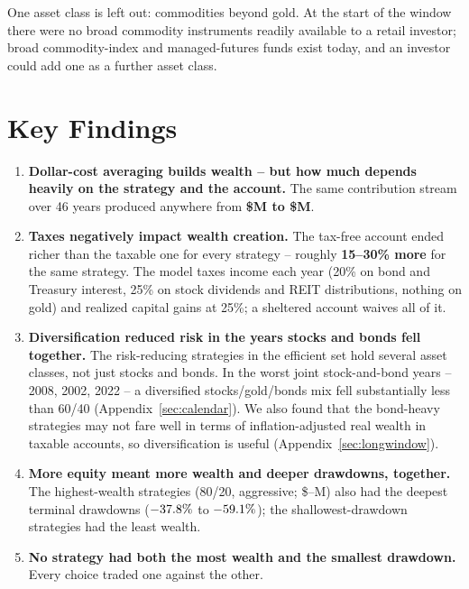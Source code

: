 \documentclass[11pt]{article}
\begin{document}
One asset class is left out: commodities beyond gold. At the start of the window there were no broad
commodity instruments readily available to a retail investor; broad commodity-index and
managed-futures funds exist today, and an investor could add one as a further asset class.

\section{Key Findings}\label{sec:keyfindings}

\begin{enumerate}

\item \textbf{Dollar-cost averaging builds wealth -- but how much depends heavily on the strategy and
the account.} The same contribution stream over 46 years produced anywhere from \textbf{\$\WealthRangeLo M to \$\WealthRangeHi M}.

\item \textbf{Taxes negatively impact wealth creation.} The tax-free account ended richer than the
taxable one for every strategy -- roughly \textbf{15--30\% more} for the same strategy. The model taxes
income each year (20\% on bond and Treasury interest, 25\% on stock dividends and REIT distributions,
nothing on gold) and realized capital gains at 25\%; a sheltered account waives all of it.

\item \textbf{Diversification reduced risk in the years stocks and bonds fell together.} The
risk-reducing strategies in the efficient set hold several asset classes, not just stocks and bonds. In
the worst joint stock-and-bond years -- 2008, 2002, 2022 -- a diversified stocks/gold/bonds mix fell
substantially less than 60/40 (Appendix~\ref{sec:calendar}). We also found that the bond-heavy
strategies may not fare well in terms of inflation-adjusted real wealth in taxable accounts, so
diversification is useful (Appendix~\ref{sec:longwindow}).

\item \textbf{More equity meant more wealth and deeper drawdowns, together.} The highest-wealth
strategies (80/20, aggressive; \$\EquityHeavyLo--\EquityHeavyHi M) also had the deepest terminal drawdowns ($-37.8\%$ to $-59.1\%$);
the shallowest-drawdown strategies had the least wealth.

\item \textbf{No strategy had both the most wealth and the smallest drawdown.} Every choice traded one
against the other.


\end{enumerate}
\end{document}
